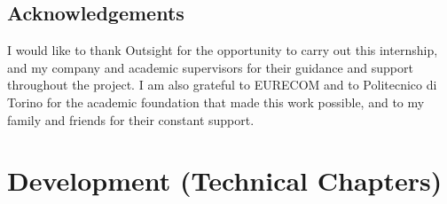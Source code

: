 \documentclass[12pt,a4paper,oneside,openany]{toptesi}
\begin{document}

\cleardoublepage


{}




\chapter*{Acknowledgements}
I would like to thank Outsight for the opportunity to carry out this internship, and my company and academic supervisors for their guidance and support throughout the project. I am also grateful to EURECOM and to Politecnico di Torino for the academic foundation that made this work possible, and to my family and friends for their constant support.

\tableofcontents






\part{Development (Technical Chapters)}









\printbibliography[title={Bibliography / References}]
\end{document}
